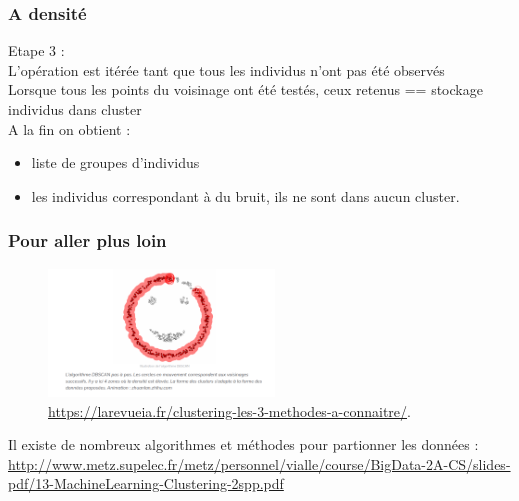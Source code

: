 \begin{frame}
  \frametitle{A densité}
 Etape 3 : \\

 L'opération est itérée tant que tous les individus n'ont pas été observés \\
 Lorsque tous les points du voisinage ont été testés, ceux retenus == stockage individus dans cluster \\
 A la fin on obtient :
\begin{itemize}
\item {} liste de groupes d’individus 
\item {} les individus correspondant à du bruit, ils ne sont dans aucun cluster. 
\end{itemize}
\end{frame}

\begin{frame}
  \frametitle{Pour aller plus loin}

\begin{figure}
  \includegraphics[width=6cm]{images/cluster_densite.png}
  \caption{\url{https://larevueia.fr/clustering-les-3-methodes-a-connaitre/}.}
  \end{figure}
  
Il existe de nombreux algorithmes et méthodes pour partionner les données :
\url{http://www.metz.supelec.fr/metz/personnel/vialle/course/BigData-2A-CS/slides-pdf/13-MachineLearning-Clustering-2spp.pdf}

  
\end{frame}




